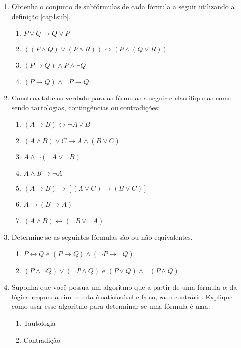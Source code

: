 \begin{enumerate}
        \item Obtenha o conjunto de subf\'ormulas de cada f\'ormula a
          seguir utilizando a defini\c{c}\~ao \ref{cap1sub}.
        \begin{enumerate}
           \item $P\lor Q \rightarrow Q \lor P$
           \item $((P\land Q)\lor (P\land R))\leftrightarrow(P\land (Q\lor R))$
           \item $(P\rightarrow Q) \land P\land \neg Q$
           \item $(P \rightarrow Q)\land \neg P \rightarrow Q$
        \end{enumerate}
	\item Construa tabelas verdade para as f\'ormulas a seguir e
          classifique-as como sendo tautologias, conting\^encias ou contradi\c{c}\~oes:
	\begin{enumerate}
		\item $(A\rightarrow B)\leftrightarrow\neg A\lor B$
		\item $(A\land B)\lor C\rightarrow A\land(B\lor C)$
		\item $A\land\neg (\neg A\lor \neg B)$
		\item $A\land B\rightarrow\neg A$
		\item $(A\rightarrow B)\rightarrow[(A\lor C)\rightarrow (B\lor C)]$
		\item $A\rightarrow(B\rightarrow A)$
		\item $(A\land B)\leftrightarrow(\neg B\lor \neg A)$
	\end{enumerate}
        \item Determine se as seguintes f\'ormulas s\~ao ou n\~ao
          equivalentes.
         \begin{enumerate}
		\item $P\leftrightarrow Q$ e $(P\rightarrow Q)\land(\neg P\rightarrow \neg Q)$
		\item $(P\land\neg Q)\lor (\neg P\land Q)$ e $(P\lor Q)\land\neg(P\land Q)$
          \end{enumerate}
          \item Suponha que voc\^e possua um algoritmo que a partir de
            uma f\'ormula $\alpha$ da l\'ogica responda sim se esta
            \'e satisfaz\'ivel e falso, caso contr\'ario. Explique
            como usar esse algoritmo para determinar se uma f\'ormula
            \'e uma:
            \begin{enumerate}
              \item Tautologia
              \item Contradi\c{c}\~ao
             \end{enumerate}
\end{enumerate}


